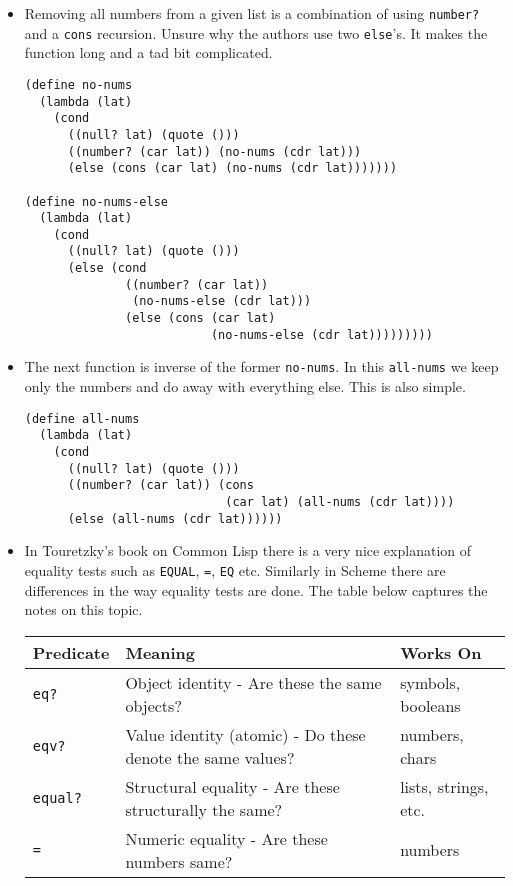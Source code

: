 \documentclass[11pt]{article}
\begin{document}
\begin{itemize}
\begin{verbatim}
\end{verbatim}

\item Removing all numbers from a given list is a combination of using \texttt{number?} and a \texttt{cons} recursion. Unsure why the authors use two \texttt{else}'s. It makes
the function long and a tad bit complicated.
\begin{verbatim}
(define no-nums
  (lambda (lat)
    (cond
      ((null? lat) (quote ()))
      ((number? (car lat)) (no-nums (cdr lat)))
      (else (cons (car lat) (no-nums (cdr lat)))))))

(define no-nums-else
  (lambda (lat)
    (cond
      ((null? lat) (quote ()))
      (else (cond
              ((number? (car lat))
               (no-nums-else (cdr lat)))
              (else (cons (car lat)
                          (no-nums-else (cdr lat)))))))))

\end{verbatim}

\item The next function is inverse of the former \texttt{no-nums}. In this \texttt{all-nums} we keep only the numbers and do away with everything else. This is also simple.
\begin{verbatim}
(define all-nums
  (lambda (lat)
    (cond
      ((null? lat) (quote ()))
      ((number? (car lat)) (cons
                            (car lat) (all-nums (cdr lat))))
      (else (all-nums (cdr lat))))))

\end{verbatim}

\item In Touretzky's book on Common Lisp there is a very nice explanation of equality tests such as \texttt{EQUAL}, \texttt{=}, \texttt{EQ} etc. Similarly in Scheme there are differences
in the way equality tests are done. The table below captures the notes on this topic.

\begin{center}
\begin{tabular}{lll}
Predicate & Meaning & Works On\\[0pt]
\hline
\texttt{eq?} & Object identity - Are these the same objects? & symbols, booleans\\[0pt]
\texttt{eqv?} & Value identity (atomic) - Do these denote the same values? & numbers, chars\\[0pt]
\texttt{equal?} & Structural equality - Are these structurally the same? & lists, strings, etc.\\[0pt]
\texttt{=} & Numeric equality - Are these numbers same? & numbers\\[0pt]
\end{tabular}
\end{center}


\end{itemize}
\end{document}
